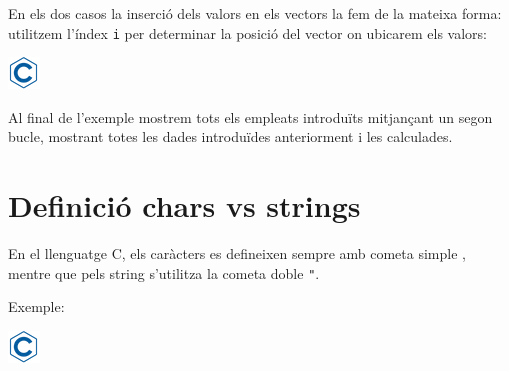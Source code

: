\documentclass[]{book}
\newenvironment{Shaded}{\begin{snugshade}}{\end{snugshade}}
\newcommand{\DataTypeTok}[1]{\textcolor[rgb]{0.13,0.29,0.53}{#1}}
\newcommand{\DecValTok}[1]{\textcolor[rgb]{0.00,0.00,0.81}{#1}}
\newcommand{\CharTok}[1]{\textcolor[rgb]{0.31,0.60,0.02}{#1}}
\newcommand{\SpecialCharTok}[1]{\textcolor[rgb]{0.00,0.00,0.00}{#1}}
\newcommand{\StringTok}[1]{\textcolor[rgb]{0.31,0.60,0.02}{#1}}
\newcommand{\ImportTok}[1]{#1}
\newcommand{\CommentTok}[1]{\textcolor[rgb]{0.56,0.35,0.01}{\textit{#1}}}
\newcommand{\ControlFlowTok}[1]{\textcolor[rgb]{0.13,0.29,0.53}{\textbf{#1}}}
\newcommand{\PreprocessorTok}[1]{\textcolor[rgb]{0.56,0.35,0.01}{\textit{#1}}}
\newcommand{\NormalTok}[1]{#1}
\begin{document}
En els dos casos la inserció dels valors en els vectors la fem de la
mateixa forma: utilitzem l'índex \texttt{i} per determinar la posició
del vector on ubicarem els valors:

\includegraphics{./img/c.png}

\begin{Shaded}
\end{Shaded}

Al final de l'exemple mostrem tots els empleats introduïts mitjançant un
segon bucle, mostrant totes les dades introduïdes anteriorment i les
calculades.

\section{Definició chars vs strings}\label{definicio-chars-vs-strings}

En el llenguatge C, els caràcters es defineixen sempre amb cometa simple
\texttt{\textquotesingle{}}, mentre que pels string s'utilitza la cometa
doble \texttt{"}.

Exemple:

\includegraphics{./img/c.png}

\begin{Shaded}
\end{Shaded}
\end{document}
